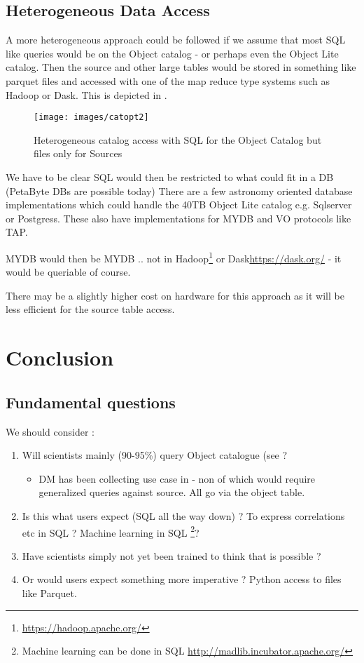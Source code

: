 \subsection{Heterogeneous Data Access }
 A more heterogeneous approach could be followed if we assume that most SQL like queries would be on the Object catalog - or perhaps even the Object Lite catalog.  Then the source and other large tables would be stored in something like parquet files and accessed with one of the map reduce type systems such as Hadoop or Dask. This is depicted in .

\begin{figure}
\begin{center}
 \texttt{[image: images/catopt2]}
\caption{ Heterogeneous catalog access with SQL for the Object Catalog but files only for Sources \label{fig:catopt2}}
\end{center}
\end{figure}

We have to be clear SQL would then be restricted to what could fit in a DB (PetaByte DBs are possible today)
There are a few astronomy oriented database implementations which could handle the 40TB Object Lite catalog e.g. Sqlserver or Postgress. These also have implementations for MYDB and VO protocols like TAP.

MYDB would then be MYDB .. not in Hadoop\footnote{\url{https://hadoop.apache.org/}} or Dask{\url{https://dask.org/}} - it would be queriable of course.

There may be a slightly higher cost on hardware for this approach as it will be less efficient for the source table access.

\section {Conclusion}
\subsection{Fundamental questions}
We should consider :
\begin{enumerate}
\item Will scientists mainly (90-95\%) query Object catalogue (see ?
	\begin{itemize}
	\item DM has been collecting use case in  - non of which would require generalized queries against source. All go via the object table.
	\end{itemize}
\item  Is this what users expect (SQL all the way down) ? To express correlations etc in SQL ? Machine learning in SQL
\footnote{Machine learning  can be done in SQL \url{http://madlib.incubator.apache.org/}}?

\item Have scientists  simply not yet been trained to think that is possible ?
 \item Or would users expect something more imperative ? Python access to files like Parquet.
\end{enumerate}


